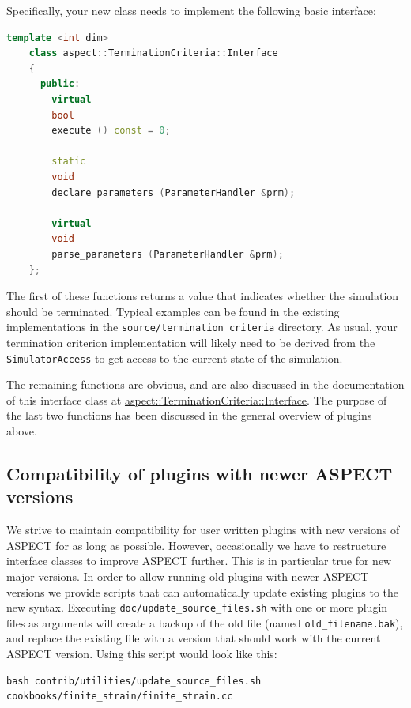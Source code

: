 \documentclass{article}
\newcommand{\aspect}{\textsc{ASPECT}}
\begin{document}
Specifically, your new class needs to implement the following basic interface:
\begin{lstlisting}[frame=single,language=C++]
    template <int dim>
    class aspect::TerminationCriteria::Interface
    {
      public:
        virtual
        bool
        execute () const = 0;

        static
        void
        declare_parameters (ParameterHandler &prm);

        virtual
        void
        parse_parameters (ParameterHandler &prm);
    };
\end{lstlisting}
The first of these functions returns a value that indicates whether the
simulation should be terminated.
Typical examples can be found in the existing implementations in the
\texttt{source/termination\_criteria} directory. As usual, your termination
criterion implementation will likely need to be derived from the
\texttt{SimulatorAccess} to get access to the current state of the simulation.

The remaining functions are
obvious, and are also discussed in the documentation of this interface class at
\href{doc/doxygen/classaspect_1_1TerminationCriteria_1_1Interface.html}{aspect::TerminationCriteria::Interface}.
The purpose
of the last two functions has been discussed in the general overview of
plugins above.


\subsection{Compatibility of plugins with newer \aspect{} versions}

We strive to maintain compatibility for user written plugins with new versions
of \aspect{} for as long as possible. However, occasionally we have to
restructure interface classes to improve \aspect{} further. This is in
particular true for new major versions. In order to allow running old plugins
with newer \aspect{} versions we provide scripts that can automatically update
existing plugins to the new syntax. Executing
\texttt{doc/update\_source\_files.sh} with one or more plugin files as
arguments will create a backup of the old file (named
\texttt{old\_filename.bak}), and replace the existing file with a version that
should work with the current \aspect{} version. Using this script would look
like this:

\begin{lstlisting}[frame=single,language=ksh,showstringspaces=false]
bash contrib/utilities/update_source_files.sh cookbooks/finite_strain/finite_strain.cc
\end{lstlisting}
\end{document}
